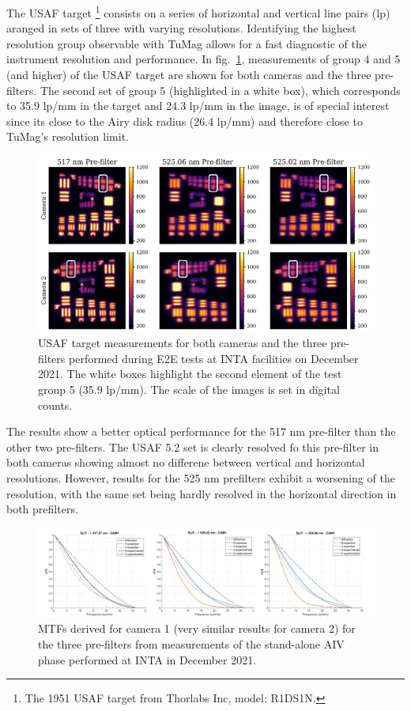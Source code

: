 The USAF target \footnote{The 1951 USAF target from Thorlabs Inc, model: R1DS1N.} consists on a series of horizontal and vertical line pairs (lp) aranged in sets of three with varying resolutions. Identifying the highest resolution group observable with TuMag allows for a fast diagnostic of the instrument resolution and performance. In fig.~\ref{tumag : USAF}, measurements of group 4 and 5 (and higher) of the USAF target are shown for both cameras and the three pre-filters. The second set of group 5 (highlighted in a white box), which corresponds to 35.9 lp/mm in the target and 24.3 lp/mm in the image, is of special interest since its close to the Airy disk radius (26.4 lp/mm) and therefore close to TuMag's resolution limit. 

\begin{figure}[t]
    \includegraphics[width=\textwidth]{figures/TuMag/USAF_E2E.pdf}
    \caption[Optical E2E USAF measurements.]{
      USAF target measurements for both cameras and the three pre-filters performed during E2E tests at INTA facilities on December 2021. The white boxes highlight the second element of the test group 5 (35.9 lp/mm). The scale of the images is set in digital counts.}
      \label{tumag : USAF}
\end{figure}

The results show a better optical performance for the 517 nm pre-filter than the other two pre-filters. The USAF 5.2 set is clearly resolved fo this pre-filter in both cameras showing almost no differene between vertical and horizontal resolutions. However, results for the 525 nm prefilters exhibit a worsening of the resolution, with the same set being hardly resolved in the horizontal direction in both prefilters. 

\begin{figure}[t]
    \includegraphics[width=\textwidth]{figures/TuMag/mtfs.pdf}
    \caption[TuMag's MTFs.]{MTFs derived for camera 1 (very similar results for camera 2) for the three pre-filters from measurements of the stand-alone AIV phase performed at INTA in December 2021.  
      \label{fig_tumag:mtfs}}
\end{figure}


